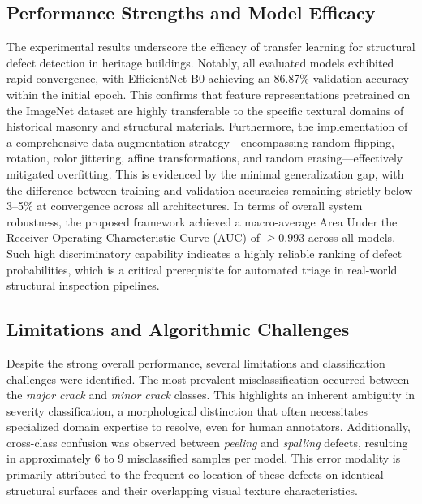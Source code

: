 \documentclass[conference]{IEEEtran}
\begin{document}
\subsection{Performance Strengths and Model Efficacy}
The experimental results underscore the efficacy of transfer learning for structural defect detection in heritage buildings. Notably, all evaluated models exhibited rapid convergence, with EfficientNet-B0 achieving an 86.87\% validation accuracy within the initial epoch. This confirms that feature representations pretrained on the ImageNet dataset are highly transferable to the specific textural domains of historical masonry and structural materials. Furthermore, the implementation of a comprehensive data augmentation strategy---encompassing random flipping, rotation, color jittering, affine transformations, and random erasing---effectively mitigated overfitting. This is evidenced by the minimal generalization gap, with the difference between training and validation accuracies remaining strictly below 3--5\% at convergence across all architectures. In terms of overall system robustness, the proposed framework achieved a macro-average Area Under the Receiver Operating Characteristic Curve (AUC) of $\geq 0.993$ across all models. Such high discriminatory capability indicates a highly reliable ranking of defect probabilities, which is a critical prerequisite for automated triage in real-world structural inspection pipelines.

\subsection{Limitations and Algorithmic Challenges}
Despite the strong overall performance, several limitations and classification challenges were identified. The most prevalent misclassification occurred between the \textit{major crack} and \textit{minor crack} classes. This highlights an inherent ambiguity in severity classification, a morphological distinction that often necessitates specialized domain expertise to resolve, even for human annotators. Additionally, cross-class confusion was observed between \textit{peeling} and \textit{spalling} defects, resulting in approximately 6 to 9 misclassified samples per model. This error modality is primarily attributed to the frequent co-location of these defects on identical structural surfaces and their overlapping visual texture characteristics. 
\end{document}
